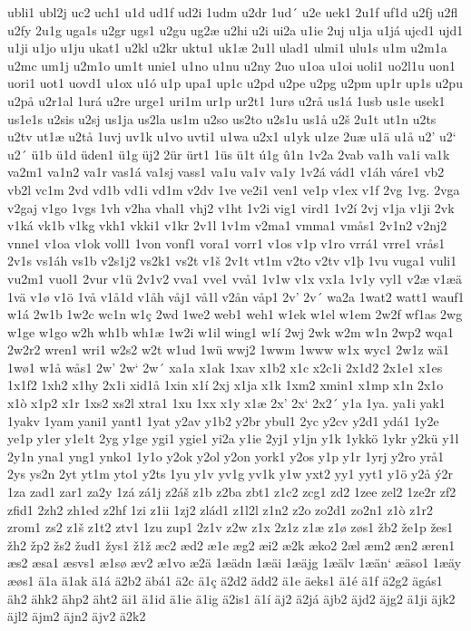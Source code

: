 ubli1
ubl2j
uc2
uch1
u1d
ud1f
ud2i
1udm
u2dr
1ud´
u2e
uek1
2u1f
uf1d
u2fj
u2fl
u2fy
2u1g
uga1s
u2gr
ugs1
u2gu
ug2æ
u2hi
u2i
ui2a
u1ie
2uj
u1ja
u1já
ujcd1
ujd1
u1ji
u1jo
u1ju
ukat1
u2kl
u2kr
uktu1
uk1æ
2u1l
ulad1
ulmi1
ulu1s
u1m
u2m1a
u2mc
um1j
u2m1o
um1t
unie1
u1no
u1nu
u2ny
2uo
u1oa
u1oi
uoli1
uo2l1u
uon1
uori1
uot1
uovd1
u1ox
u1ó
u1p
upa1
up1c
u2pd
u2pe
u2pg
u2pm
up1r
up1s
u2pu
u2på
u2r1al
1urá
u2re
urge1
uri1m
ur1p
ur2t1
1urø
u2rå
us1á
1usb
us1e
usek1
us1e1s
u2sis
u2sj
us1ja
us2la
us1m
u2so
us2to
u2s1u
us1å
u2š
2u1t
ut1n
u2ts
u2tv
ut1æ
u2tå
1uvj
uv1k
u1vo
uvti1
u1wa
u2x1
u1yk
u1ze
2uæ
u1ä
u1å
u2'
u2`
u2´
ü1b
ü1d
üden1
ü1g
üj2
2ür
ürt1
1üs
ü1t
ú1g
û1n
1v2a
2vab
va1h
va1i
va1k
va2m1
va1n2
va1r
vas1á
va1sj
vass1
va1u
va1v
va1y
1v2á
vád1
v1áh
váre1
vb2
vb2l
vc1m
2vd
vd1b
vd1i
vd1m
v2dv
1ve
ve2i1
ven1
ve1p
v1ex
v1f
2vg
1vg.
2vga
v2gaj
v1go
1vgs
1vh
v2ha
vhal1
vhj2
v1ht
1v2i
vig1
vird1
1v2í
2vj
v1ja
v1ji
2vk
v1ká
vk1b
v1kg
vkh1
vkki1
v1kr
2v1l
1v1m
v2ma1
vmma1
vmås1
2v1n2
v2nj2
vnne1
v1oa
v1ok
voll1
1von
vonf1
vora1
vorr1
v1os
v1p
v1ro
vrrá1
vrre1
vrås1
2v1s
vs1áh
vs1b
v2s1j2
vs2k1
vs2t
v1š
2v1t
vt1m
v2to
v2tv
v1þ
1vu
vuga1
vuli1
vu2m1
vuol1
2vur
v1ü
2v1v2
vva1
vve1
vvå1
1v1w
v1x
vx1a
1v1y
vyl1
v2æ
v1æä
1vä
v1ø
v1ö
1vå
v1å1d
v1åh
våj1
vå1l
v2ån
våp1
2v'
2v´
wa2a
1wat2
watt1
wauf1
w1á
2w1b
1w2c
wc1n
w1ç
2wd
1we2
web1
weh1
w1ek
w1el
w1em
2w2f
wf1as
2wg
w1ge
w1go
w2h
wh1b
wh1æ
1w2i
w1il
wing1
w1í
2wj
2wk
w2m
w1n
2wp2
wqa1
2w2r2
wren1
wri1
w2s2
w2t
w1ud
1wü
wwj2
1wwm
1www
w1x
wyc1
2w1z
wä1
1wø1
w1å
wås1
2w'
2w`
2w´
xa1a
x1ak
1xav
x1b2
x1c
x2c1i
2x1d2
2x1e1
x1es
1x1f2
1xh2
x1hy
2x1i
xid1å
1xin
x1í
2xj
x1ja
x1k
1xm2
xmin1
x1mp
x1n
2x1o
x1ò
x1p2
x1r
1xs2
xs2l
xtra1
1xu
1xx
x1y
x1æ
2x'
2x`
2x2´
y1a
1ya.
ya1i
yak1
1yakv
1yam
yani1
yant1
1yat
y2av
y1b2
y2br
ybul1
2yc
y2cv
y2d1
ydá1
1y2e
ye1p
y1er
y1e1t
2yg
y1ge
ygi1
ygie1
yi2a
y1ie
2yj1
y1jn
y1k
1ykkö
1ykr
y2kü
y1l
2y1n
yna1
yng1
ynko1
1y1o
y2ok
y2ol
y2on
york1
y2os
y1p
y1r
1yrj
y2ro
yrå1
2ys
ys2n
2yt
yt1m
yto1
y2ts
1yu
y1v
yv1g
yv1k
y1w
yxt2
yy1
yyt1
y1ö
y2å
ý2r
1za
zad1
zar1
za2y
1zá
zá1j
z2áš
z1b
z2ba
zbt1
z1c2
zcg1
zd2
1zee
zel2
1ze2r
zf2
zfid1
2zh2
zh1ed
z2hf
1zi
z1ii
1zj2
zlád1
z1l2l
z1n2
z2o
zo2d1
zo2n1
z1ò
z1r2
zrom1
zs2
z1š
z1t2
ztv1
1zu
zup1
2z1v
z2w
z1x
2z1z
z1æ
z1ø
zøs1
žb2
že1p
žes1
žh2
žp2
žs2
žud1
žys1
ž1ž
æc2
æd2
æ1e
æg2
æi2
æ2k
æko2
2æl
æm2
æn2
æren1
æs2
æsa1
æsvs1
æ1sø
æv2
æ1vo
æ2ä
1æädn
1æäi
1æäjg
1æälv
1æän`
æäso1
1æäy
æøs1
ä1a
ä1ak
ä1á
ä2b2
äbá1
ä2c
ä1ç
ä2d2
ädd2
ä1e
äeks1
ä1é
ä1f
ä2g2
ägás1
äh2
ähk2
ähp2
äht2
äi1
ä1id
ä1ie
ä1ig
ä2is1
ä1í
äj2
ä2já
äjb2
äjd2
äjg2
ä1ji
äjk2
äjl2
äjm2
äjn2
äjv2
ä2k2
